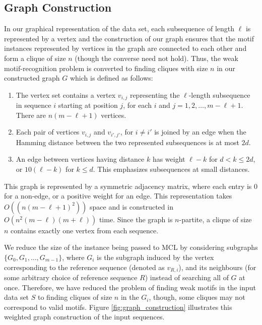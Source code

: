 \subsection{Graph Construction}\label{graph_construction} 

In our graphical representation of the data set, each subsequence of length $\ell$ is represented by a vertex and the construction of our graph ensures that the motif instances represented by vertices in the graph are connected to each other and form a clique of size $n$ (though the converse need not hold).  Thus, the weak motif-recognition problem is converted to finding cliques with size $n$ in our constructed graph $G$ which is defined as follows:

\begin{enumerate}
\item The vertex set contains a vertex $v_{i,j}$ representing the $\ell$-length subsequence in sequence $i$ starting at position $j$, for each $i$ and $j = 1, 2, \dots, m-\ell+1$. There are $n(m-\ell+1)$ vertices.
\item Each pair of vertices $v_{i,j}$ and $v_{i',j'}$, for $i \neq i'$ is joined by an edge when the Hamming distance between the two represented subsequences is at most $2d$.
\item An edge between vertices having distance $k$ has weight $\ell - k$ for $d < k \leq 2d$, or $10(\ell-k)$ for $k \leq d$.  This emphasizes subsequences at small distances.
\end{enumerate}

\noindent This graph is represented by a symmetric adjacency matrix, where each entry is 0 for a non-edge, or a positive weight for an edge. This representation takes $O((n(m-\ell+1)^2))$ space and is constructed in $O(n^2(m-\ell)(m+\ell))$ time. Since the graph is $n$-partite, a clique of size $n$ contains exactly one vertex from each sequence. 

We reduce the size of the instance being passed to MCL by considering subgraphs $\{G_0, G_1, \dots, G_{m-1}\}$, where $G_i$ is the subgraph induced by the vertex corresponding to the reference sequence (denoted as $v_{R,i}$), and its neighbours (for some arbitrary choice of reference sequence $R$) instead of searching all of $G$ at once. Therefore, we have reduced the problem of finding weak motifs in the input data set $S$ to finding cliques of size $n$ in the $G_i$, though, some cliques may not correspond to valid motifs. Figure \ref{fig:graph_construction} illustrates this weighted graph construction of the input sequences.  

